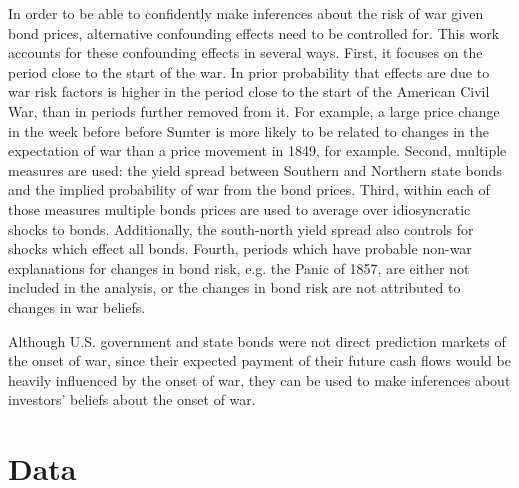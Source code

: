 In order to be able to confidently make inferences about the risk of war given bond prices, alternative confounding effects need to be controlled for.
This work accounts for these confounding effects in several ways.
First, it focuses on the period close to the start of the war.
In prior probability that effects are due to war risk factors is higher in the period close to the start of the American Civil War, than in periods further removed from it.
For example, a large price change in the week before before Sumter is more likely to be related to changes in the expectation of war than a price movement in 1849, for example.
Second, multiple measures are used: the yield spread between Southern and Northern state bonds and the implied probability of war from the bond prices.
Third, within each of those measures multiple bonds prices are used to average over idiosyncratic shocks to bonds.
Additionally, the south-north yield spread also controls for shocks which effect all bonds.
Fourth, periods which have probable non-war explanations for changes in bond risk, e.g. the Panic of 1857, are either not included in the analysis, or the changes in bond risk are not attributed to changes in war beliefs.

Although U.S. government and state bonds were not direct prediction markets of the onset of war, since their expected payment of their future cash flows would be heavily influenced by the onset of war, they can be used to make inferences about investors' beliefs about the onset of war.

\section{Data}
\label{acw_onset:sec:data}

